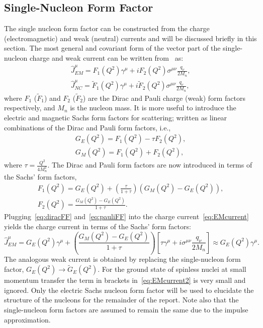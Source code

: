 \subsection{Single-Nucleon Form Factor}
\label{sec:nucleonff}

The single nucleon form factor can be constructed from the charge (electromagnetic) and weak (neutral) currents and will be discussed briefly in this section. The most general and covariant form of the vector part of the single-nucleon charge and weak current can be written from~\cite{horowitz:2012:impact} as:
\begin{gather}
\hat{J}^{\mu}_{EM} = F_1(Q^2)\gamma ^{\mu} +iF_2(Q^2)\sigma ^{\mu \nu}\frac{q_{\nu}}{2M_n},\label{eq:EMcurrent} \\
\hat{J}^{\mu}_{NC} = \widetilde{F}_1(Q^2)\gamma ^{\mu} +i\widetilde{F}_2(Q^2)\sigma ^{\mu \nu}\frac{q_{\nu}}{2M_n},
\end{gather}
where $F_1$ ($\tilde{F}_1$) and $F_2$ ($\tilde{F}_2$) are the Dirac and Pauli charge (weak) form factors respectively, and $M_n$ is the nucleon mass. It is more useful to introduce the electric and magnetic Sachs form factors for scattering; written as linear combinations of the Dirac and Pauli form factors, i.e.,
\begin{gather}
G_E(Q^2)=F_1(Q^2)-\tau F_2(Q^2), \\
G_M(Q^2)=F_1(Q^2)+F_2(Q^2),
\end{gather}
where $\tau = \frac{Q^2}{4M_n^2}$. The Dirac and Pauli form factors are now introduced in terms of the Sachs' form factors,
\begin{gather}
F_1(Q^2)=G_E(Q^2) + \left( \frac{\tau}{1+\tau} \right)(G_M(Q^2) - G_E(Q^2)),\label{eq:diracFF} \\
F_2(Q^2)=\frac{G_M(Q^2)-G_E(Q^2)}{1+\tau}.\label{eq:pauliFF}
\end{gather} 
Plugging~\eqref{eq:diracFF} and~\eqref{eq:pauliFF} into the charge current~\eqref{eq:EMcurrent} yields the charge current in terms of the Sachs' form factors:
\begin{equation}
\hat{J}^{\mu}_{EM}=G_E(Q^2)\gamma ^{\mu} + \left( \frac{G_M(Q^2)-G_E(Q^2)}{1+\tau} \right) \left[ \tau \gamma ^{\mu} + i\sigma^{\mu \nu} \frac{q_{\nu}}{2M_n} \right] \approx G_E(Q^2)\gamma ^{\mu}.\label{eq:EMcurrent2}
\end{equation}
The analogous weak current is obtained by replacing the single-nucleon form factor, $G_E(Q^2)\rightarrow \widetilde{G}_E(Q^2)$. For the ground state of spinless nuclei at small momentum transfer the term in brackets in~\eqref{eq:EMcurrent2} is very small and ignored. Only the electric Sachs nucleon form factor will be used to elucidate the structure of the nucleons for the remainder of the report. Note also that the single-nucleon form factors are assumed to remain the same due to the impulse approximation. 

